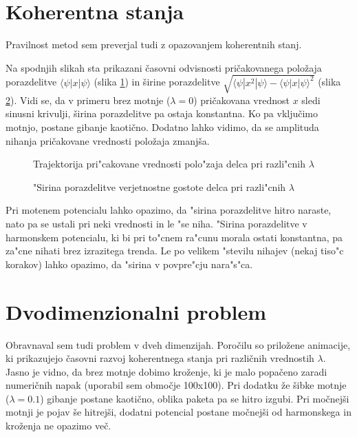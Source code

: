 \documentclass[a4paper,10pt]{article}
\begin{document}
\section{Koherentna stanja}

Pravilnost metod sem preverjal tudi z opazovanjem koherentnih stanj. 

Na spodnjih slikah sta prikazani časovni odvisnosti pričakovanega položaja porazdelitve $\langle\psi|x|\psi\rangle$ (slika \ref{fig:trajektorija}) in 
širine porazdelitve $\sqrt{\langle\psi|x^{2}|\psi\rangle - \langle\psi|x|\psi\rangle^{2}}$ (slika \ref{fig:sirina}). 
Vidi se, da v primeru brez motnje ($\lambda=0$) pričakovana vrednost $x$ sledi sinusni krivulji, širina porazdelitve pa ostaja konstantna.
Ko pa vključimo motnjo, postane gibanje kaotično. 
Dodatno lahko vidimo, da se amplituda nihanja pričakovane vrednosti položaja zmanjša. 

\begin{figure}[h]

\caption{Trajektorija pri"cakovane vrednosti polo"zaja delca pri razli"cnih $\lambda$} 
\label{fig:trajektorija}
\end{figure}

\begin{figure}[h]

\caption{"Sirina porazdelitve verjetnostne gostote delca pri razli"cnih $\lambda$} 
\label{fig:sirina}
\end{figure}

Pri motenem potencialu lahko opazimo, da "sirina porazdelitve hitro naraste, nato pa se ustali pri neki vrednosti in le "se niha. 
"Sirina porazdelitve v harmonskem potencialu, ki bi pri to"cnem ra"cunu morala ostati konstantna, pa za"cne nihati brez izrazitega trenda. 
Le po velikem "stevilu nihajev (nekaj tiso"c korakov) lahko opazimo, da "sirina v povpre"cju nara"s"ca. 

\section{Dvodimenzionalni problem}

Obravnaval sem tudi problem v dveh dimenzijah. 
Poročilu so priložene animacije, ki prikazujejo časovni razvoj koherentnega stanja pri različnih vrednostih $\lambda$. 
Jasno je vidno, da brez motnje dobimo kroženje, ki je malo popačeno zaradi numeričnih napak (uporabil sem območje 100x100). 
Pri dodatku že šibke motnje ($\lambda=0.1$) gibanje postane kaotično, oblika paketa pa se hitro izgubi. 
Pri močnejši motnji je pojav še hitrejši, dodatni potencial postane močnejši od harmonskega in kroženja ne opazimo več. 
\end{document}
